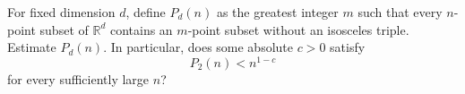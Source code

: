 For fixed dimension $d$, define $P_d(n)$ as the greatest integer $m$ such that every $n$-point subset of $\mathbb R^d$ contains an $m$-point subset without an isosceles triple. Estimate $P_d(n)$. In particular, does some absolute $c>0$ satisfy
\[P_2(n)<n^{1-c}\]
for every sufficiently large $n$?
